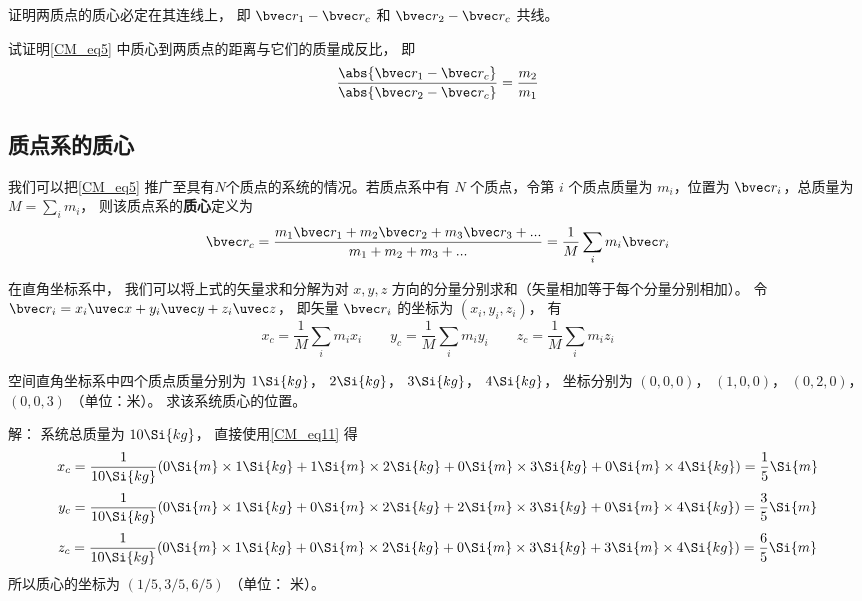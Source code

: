 \begin{exercise}{}
证明两质点的质心必定在其连线上， 即 $\bvec r_1 - \bvec r_c$ 和 $\bvec r_2 - \bvec r_c$ 共线。%
\end{exercise}

\begin{exercise}{}
试证明\autoref{CM_eq5} 中质心到两质点的距离与它们的质量成反比， 即
\begin{equation}\label{CM_eq6}
\frac{\abs{\bvec r_1 - \bvec r_c}}{\abs{\bvec r_2 - \bvec r_c}} = \frac{m_2}{m_1}
\end{equation}
\end{exercise}

\subsection{质点系的质心}
我们可以把\autoref{CM_eq5} 推广至具有$N$个质点的系统的情况。若质点系中有 $N$ 个质点，令第 $i$ 个质点质量为 $m_i$，位置为 $\bvec r_i$，总质量为 $M = \sum\limits_i m_i$， 则该质点系的\textbf{质心}定义为
\begin{equation}\label{CM_eq1}
\bvec r_c = \frac{m_1 \bvec r_1 + m_2 \bvec r_2 + m_3 \bvec r_3 +... }{m_1 + m_2 +m_3+...}=\frac{1}{M}\sum_i m_i \bvec r_i
\end{equation}

在直角坐标系中， 我们可以将上式的矢量求和分解为对 $x, y, z$ 方向的分量分别求和（矢量相加等于每个分量分别相加）。 令 $\bvec r_i = x_i \uvec x + y_i \uvec y + z_i \uvec z$， 即矢量 $\bvec r_i$ 的坐标为 $(x_i, y_i, z_i)$， 有
\begin{equation}\label{CM_eq11}
x_c = \frac{1}{M}\sum_i m_i x_i \qquad
y_c = \frac{1}{M}\sum_i m_i y_i \qquad
z_c = \frac{1}{M}\sum_i m_i z_i
\end{equation}

\begin{example}{}
空间直角坐标系中四个质点质量分别为 $1 \Si{kg}$， $2 \Si{kg}$， $3 \Si{kg}$， $4 \Si{kg}$， 坐标分别为 $(0, 0, 0)$， $(1, 0, 0)$， $(0, 2, 0)$， $(0, 0, 3)$ （单位：米）。 求该系统质心的位置。

解： 系统总质量为 $10 \Si{kg}$， 直接使用\autoref{CM_eq11} 得
\begin{equation}
x_c = \frac{1}{10 \Si{kg}} (0 \Si{m} \times 1 \Si{kg} + 1 \Si{m}\times 2 \Si{kg} + 0\Si{m} \times 3 \Si{kg} + 0 \Si{m}\times 4 \Si{kg}) = \frac15 \Si{m}
\end{equation}
\begin{equation}
y_c = \frac{1}{10 \Si{kg}} (0\Si{m}\times 1 \Si{kg} + 0\Si{m} \times 2 \Si{kg} + 2\Si{m} \times 3 \Si{kg} + 0 \Si{m}\times 4 \Si{kg}) = \frac35 \Si{m}
\end{equation}
\begin{equation}
z_c = \frac{1}{10 \Si{kg}} (0\Si{m}\times 1 \Si{kg} + 0\Si{m} \times 2 \Si{kg} + 0\Si{m} \times 3 \Si{kg} + 3 \Si{m}\times 4 \Si{kg}) = \frac65 \Si{m}
\end{equation}
所以质心的坐标为 $(1/5, 3/5, 6/5)$ （单位： 米）。
\end{example}

